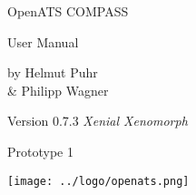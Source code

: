 \documentclass[oneside,a4paper]{memoir}
\begin{document}
\firmlists
\midsloppy
\raggedbottom


%

\frontmatter
\pagestyle{empty}


\vspace*{\fill}
\begin{center}
\HUGE\textsf{OpenATS COMPASS}\par
\end{center}

\begin{center}
\Huge\textsf{User Manual}\par
\end{center}
\begin{center}
\normalsize\textsf{by Helmut Puhr\\ \& Philipp Wagner}\par
\medskip
\normalsize\textsf{Version 0.7.3 \textit{Xenial Xenomorph}}\par\textsf{Prototype 1}\par
\end{center}
\vspace*{\fill}
\begin{center}
\texttt{[image: ../logo/openats.png]}
\setlength{\droptitle}{0pt}%
\end{center}
\clearpage

\cleardoublepage

\pagestyle{headings}

\setupshorttoc
\tableofcontents
\clearpage
\setupparasubsecs
\setupmaintoc
\tableofcontents
\setlength{\unitlength}{1pt}
\clearpage
\listoffigures
\clearpage
\listoftables
\clearpage







%
























\end{document}
